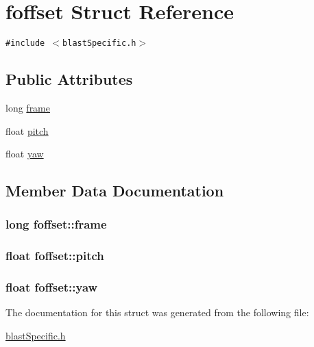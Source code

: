 \hypertarget{structfoffset}{
\section{foffset Struct Reference}
\label{structfoffset}
}
{\tt \#include $<$blastSpecific.h$>$}

\subsection*{Public Attributes}
\begin{CompactItemize}
\item 
long \hyperlink{structfoffset_e6b7e1bc264bb29f28e340a065696cc7}{frame}
\item 
float \hyperlink{structfoffset_b935184c264a43c037c792dc4ef739c2}{pitch}
\item 
float \hyperlink{structfoffset_823d42dfebb9701116cf1945801cc970}{yaw}
\end{CompactItemize}


\subsection{Member Data Documentation}
\hypertarget{structfoffset_e6b7e1bc264bb29f28e340a065696cc7}{
\subsubsection[{frame}]{\setlength{\rightskip}{0pt plus 5cm}long {\bf foffset::frame}}}
\label{structfoffset_e6b7e1bc264bb29f28e340a065696cc7}


\hypertarget{structfoffset_b935184c264a43c037c792dc4ef739c2}{
\subsubsection[{pitch}]{\setlength{\rightskip}{0pt plus 5cm}float {\bf foffset::pitch}}}
\label{structfoffset_b935184c264a43c037c792dc4ef739c2}


\hypertarget{structfoffset_823d42dfebb9701116cf1945801cc970}{
\subsubsection[{yaw}]{\setlength{\rightskip}{0pt plus 5cm}float {\bf foffset::yaw}}}
\label{structfoffset_823d42dfebb9701116cf1945801cc970}




The documentation for this struct was generated from the following file:\begin{CompactItemize}
\item 
\hyperlink{blastSpecific_8h}{blastSpecific.h}\end{CompactItemize}
